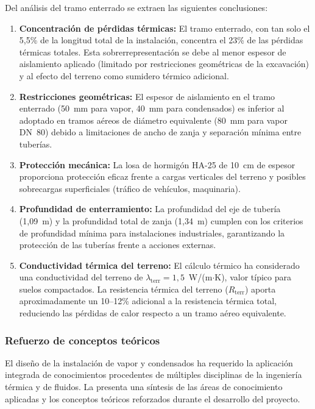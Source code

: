 Del análisis del tramo enterrado se extraen las siguientes conclusiones:

\begin{enumerate}[label=\arabic*., leftmargin=2em]
	\item \textbf{Concentración de pérdidas térmicas:} El tramo enterrado, con tan solo el 5,5\% de la longitud total de la instalación, concentra el 23\% de las pérdidas térmicas totales. Esta sobrerrepresentación se debe al menor espesor de aislamiento aplicado (limitado por restricciones geométricas de la excavación) y al efecto del terreno como sumidero térmico adicional.

	\item \textbf{Restricciones geométricas:} El espesor de aislamiento en el tramo enterrado (50~mm para vapor, 40~mm para condensados) es inferior al adoptado en tramos aéreos de diámetro equivalente (80~mm para vapor DN~80) debido a limitaciones de ancho de zanja y separación mínima entre tuberías.

	\item \textbf{Protección mecánica:} La losa de hormigón HA-25 de 10~cm de espesor proporciona protección eficaz frente a cargas verticales del terreno y posibles sobrecargas superficiales (tráfico de vehículos, maquinaria).

	\item \textbf{Profundidad de enterramiento:} La profundidad del eje de tubería (1,09~m) y la profundidad total de zanja (1,34~m) cumplen con los criterios de profundidad mínima para instalaciones industriales, garantizando la protección de las tuberías frente a acciones externas.

	\item \textbf{Conductividad térmica del terreno:} El cálculo térmico ha considerado una conductividad del terreno de $\lambda_{\text{terr}} = 1{,}5$~W/(m$\cdot$K), valor típico para suelos compactados. La resistencia térmica del terreno ($R_{\text{terr}}$) aporta aproximadamente un 10--12\% adicional a la resistencia térmica total, reduciendo las pérdidas de calor respecto a un tramo aéreo equivalente.
\end{enumerate}

\subsubsection{Refuerzo de conceptos teóricos}
\label{subsubsec:conclusiones-conceptos-teoricos}

El diseño de la instalación de vapor y condensados ha requerido la aplicación integrada de conocimientos procedentes de múltiples disciplinas de la ingeniería térmica y de fluidos. La  presenta una síntesis de las áreas de conocimiento aplicadas y los conceptos teóricos reforzados durante el desarrollo del proyecto.

